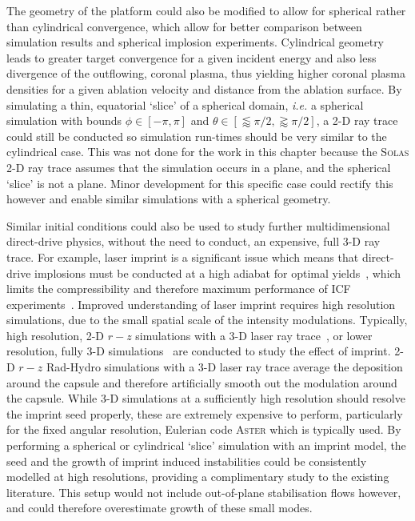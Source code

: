 The geometry of the platform could also be modified to allow for spherical rather than cylindrical convergence, which allow for better comparison between simulation results and spherical implosion experiments.
Cylindrical geometry leads to greater target convergence for a given incident energy and also less divergence of the outflowing, coronal plasma, thus yielding higher coronal plasma densities for a given ablation velocity and distance from the ablation surface.
By simulating a thin, equatorial `slice' of a spherical domain, \textit{i.e.} a spherical simulation with bounds $\phi\in[-\pi,\pi]$ and $\theta\in\left[\lessapprox\pi/2,\gtrapprox\pi/2\right]$, a 2-D ray trace could still be conducted so simulation run-times should be very similar to the cylindrical case.
This was not done for the work in this chapter because the \textsc{Solas} 2-D ray trace assumes that the simulation occurs in a plane, and the spherical `slice' is not a plane.
Minor development for this specific case could rectify this however and enable similar simulations with a spherical geometry.

Similar initial conditions could also be used to study further multidimensional direct-drive physics, without the need to conduct, an expensive, full 3-D ray trace.
For example, laser imprint is a significant issue which means that direct-drive implosions must be conducted at a high adiabat for optimal yields~\cite{patel_effects_2023}, which limits the compressibility and therefore maximum performance of \ac{ICF} experiments~\cite{dittrich_design_2014,robey_performance_2016}.
Improved understanding of laser imprint requires high resolution simulations, due to the small spatial scale of the intensity modulations.
Typically, high resolution, 2-D $r-z$ simulations with a 3-D laser ray trace~\cite{hu_direct-drive_2019}, or lower resolution, fully 3-D simulations~\cite{igumenshchev_rarefaction_2019} are conducted to study the effect of imprint.
2-D $r-z$ \ac{Rad-Hydro} simulations with a 3-D laser ray trace average the deposition around the capsule and therefore artificially smooth out the modulation around the capsule.
While 3-D simulations at a sufficiently high resolution should resolve the imprint seed properly, these are extremely expensive to perform, particularly for the fixed angular resolution, Eulerian code \textsc{Aster} which is typically used.
By performing a spherical or cylindrical `slice' simulation with an imprint model, the seed and the growth of imprint induced instabilities could be consistently modelled at high resolutions, providing a complimentary study to the existing literature.
This setup would not include out-of-plane stabilisation flows however, and could therefore overestimate growth of these small modes.
